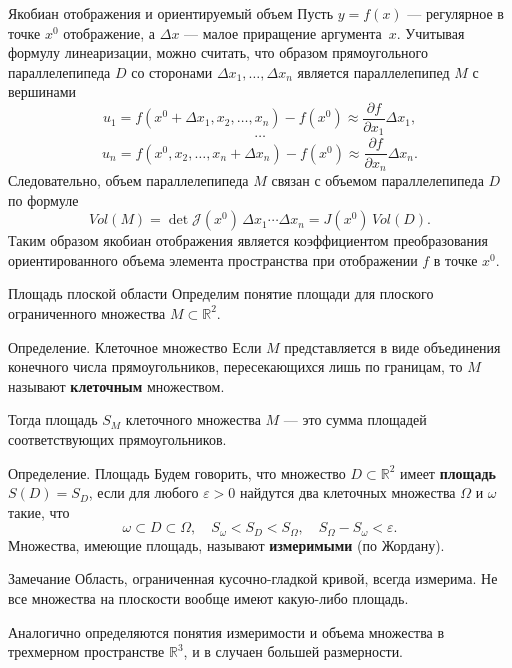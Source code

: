 \documentclass[8pt]{beamer}
\newcommand{\pp}[2]{\frac{\partial #1}{\partial #2}}
\begin{document}
\begin{frame}{Якобиан отображения и ориентируемый объем}
Пусть $y = f(x)$ --- регулярное в точке $x^0$ отображение, а $\Delta x$ --- малое приращение аргумента~$x$. Учитывая формулу линеаризации, можно считать, что образом прямоугольного параллелепипеда $D$ со сторонами $\Delta x_1,\ldots,\Delta x_n$ является параллелепипед $M$ с вершинами 
$$u_1=f(x^0+\Delta x_1,x_2,\ldots,x_n)-f(x^0) \approx \pp{f}{x_1}\Delta x_1,$$
$$\ldots$$
$$ u_n = f(x^0,x_2,\ldots,x_n+\Delta x_n)-f(x^0) \approx \pp{f}{x_n}\Delta x_n.$$
Следовательно, объем параллелепипеда $M$ связан с объемом параллелепипеда $D$ по формуле
$$Vol(M) = \det\mathcal{J}(x^0)\, \Delta x_1\cdots\Delta x_n = J(x^0)\, Vol(D).$$
Таким образом якобиан отображения является коэффициентом преобразования ориентированного объема элемента пространства при отображении $f$ в точке $x^0$.
\end{frame}

\begin{frame}{Площадь плоской области}
Определим понятие площади для плоского ограниченного множества $M\subset\mathbb{R}^2$.
\begin{block}{Определение. Клеточное множество}
Если $M$ представляется в виде объединения конечного числа прямоугольников, пересекающихся лишь по границам, то $M$ называют {\bf клеточным} множеством. 
\end{block}
Тогда площадь $S_M$ клеточного множества $M$ --- это сумма площадей соответствующих прямоугольников. 
\begin{block}{Определение. Площадь}
Будем говорить, что множество $D\subset\mathbb{R}^2$ имеет {\bf площадь} $S(D) = S_D$, если для любого $\varepsilon>0$ найдутся два клеточных множества $\Omega$ и $\omega$ такие, что 
$$\omega\subset D \subset \Omega,\quad S_\omega<S_D<S_\Omega,\quad S_\Omega-S_\omega<\varepsilon.$$
Множества, имеющие площадь, называют {\bf измеримыми} (по Жордану).
\end{block}
\begin{block}{Замечание}
Область, ограниченная кусочно-гладкой кривой, всегда измерима. Не все множества на плоскости вообще имеют какую-либо площадь.
\end{block}
Аналогично определяются понятия измеримости и объема множества в трехмерном пространстве $\mathbb{R}^3$, и в случаен большей размерности.
\end{frame}
\end{document}
